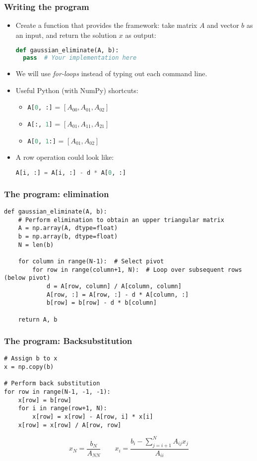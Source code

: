 \begin{frame}[fragile]
  \frametitle{Writing the program}
  \begin{itemize}
   \item Create a function that provides the framework: take matrix $A$ and vector $b$ as an input, and return the solution $x$ as output:
  \begin{lstlisting}[language=Python]
def gaussian_eliminate(A, b):
  pass  # Your implementation here
  \end{lstlisting}
  \item We will use \emph{for-loops} instead of typing out each command line.
  \item Useful Python (with NumPy) shortcuts:
  \begin{itemize}
  \item \lstinline[language=Python]$A[0, :]$   = $[A_{00}, A_{01}, A_{02}]$
  \item \lstinline[language=Python]$A[:, 1]$   = $[A_{01}, A_{11}, A_{21}]$
  \item \lstinline[language=Python]$A[0, 1:]$ = $[A_{01}, A_{02}]$
  \end{itemize}
  \item A row operation could look like:
  \begin{lstlisting}[language=Python]
A[i, :] = A[i, :] - d * A[0, :]   
  \end{lstlisting}
  \end{itemize}
\end{frame}


\begin{frame}[fragile]
  \frametitle{The program: elimination}
  \begin{lstlisting}
def gaussian_eliminate(A, b):
    # Perform elimination to obtain an upper triangular matrix
    A = np.array(A, dtype=float)
    b = np.array(b, dtype=float)
    N = len(b)

    for column in range(N-1):  # Select pivot
        for row in range(column+1, N):  # Loop over subsequent rows (below pivot)
            d = A[row, column] / A[column, column]
            A[row, :] = A[row, :] - d * A[column, :]
            b[row] = b[row] - d * b[column]

    return A, b
  \end{lstlisting}
\end{frame}

\begin{frame}[fragile]
  \frametitle{The program: Backsubstitution}
  \begin{lstlisting}
# Assign b to x
x = np.copy(b)

# Perform back substitution
for row in range(N-1, -1, -1):
    x[row] = b[row]
    for i in range(row+1, N):
        x[row] = x[row] - A[row, i] * x[i]
    x[row] = x[row] / A[row, row]    
  \end{lstlisting}
  \[
     x_N = \frac{b_N}{A_{NN}} \qquad x_i = \frac{b_i - \sum_{j=i+1}^{N}A_{ij}x_j}{A_{ii}}
  \]
\end{frame}

